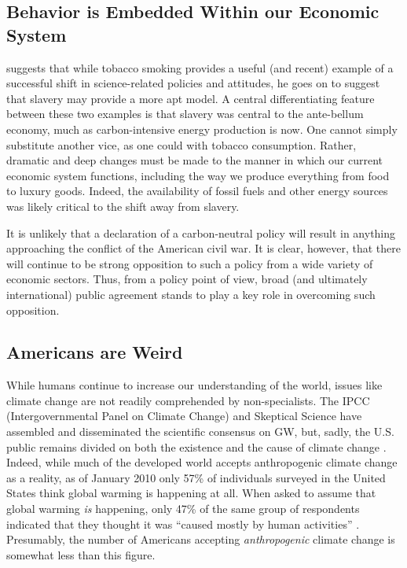 \subsection{Behavior is Embedded Within our Economic System}

\textcite{hoffman_climate_2010} suggests that while tobacco smoking provides a useful
(and recent) example of a successful shift in science-related policies and
attitudes, he goes on to suggest that slavery may provide a more apt model. A
central differentiating feature between these two examples is that slavery was
central to the ante-bellum economy, much as carbon-intensive energy production
is now.  One cannot simply substitute another vice, as one could with tobacco
consumption.  Rather, dramatic and deep changes must be made to the manner in
which our current economic system functions, including the way we produce
everything from food to luxury goods. Indeed, the availability of fossil fuels
and other energy sources was likely critical to the shift away from slavery.

It is unlikely that a declaration of a carbon-neutral policy will result in
anything approaching the conflict of the American civil war. It is clear,
however, that there will continue to be strong opposition to such a policy from
a wide variety of economic sectors. Thus, from a policy point of view, broad
(and ultimately international) public agreement stands to play a key role in
overcoming such opposition.

\subsection{Americans are Weird}

While humans continue to increase our understanding of the world, issues like
climate change are not readily comprehended by non-specialists. The IPCC
(Intergovernmental Panel on Climate Change) and Skeptical Science have assembled
and disseminated the scientific consensus on GW, but, sadly, the U.S.  public
remains divided on both the existence and the cause of climate change
\parencite[cf.][]{hoffman_growing_2011}. Indeed, while much of the developed
world accepts anthropogenic climate change as a reality, as of January 2010 only
57\% of individuals surveyed in the United States think global warming is
happening at all\parencite[Q47 in][]{leiserowitz_climate_2010}. When asked to
assume that global warming \emph{is} happening, only 47\% of the same group of
respondents indicated that they thought it was ``caused mostly by human
activities'' \parencite[Q50 in][]{leiserowitz_climate_2010}.
Presumably, the number of Americans accepting \emph{anthropogenic} climate change is
somewhat less than this figure. 

